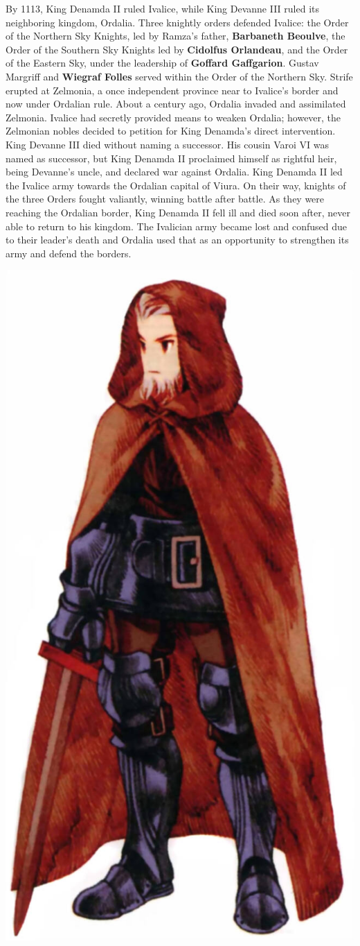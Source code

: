 By 1113, King Denamda II ruled Ivalice, while King Devanne III ruled its neighboring kingdom, Ordalia. 
Three knightly orders defended Ivalice: the Order of the Northern Sky Knights, led by Ramza's father, \textbf{Barbaneth Beoulve}, the Order of the Southern Sky Knights led by \textbf{Cidolfus Orlandeau}, and the Order of the Eastern Sky, under the leadership of \textbf{Goffard Gaffgarion}. 
Gustav Margriff and \textbf{Wiegraf Folles} served within the Order of the Northern Sky.
Strife erupted at Zelmonia, a once independent province near to Ivalice's border and now under Ordalian rule. 
About a century ago, Ordalia invaded and assimilated Zelmonia. 
Ivalice had secretly provided means to weaken Ordalia; however, the Zelmonian nobles decided to petition for King Denamda's direct intervention. 
King Devanne III died without naming a successor. 
His cousin Varoi VI was named as successor, but King Denamda II proclaimed himself as rightful heir, being Devanne's uncle, and declared war against Ordalia.
King Denamda II led the Ivalice army towards the Ordalian capital of Viura. 
On their way, knights of the three Orders fought valiantly, winning battle after battle.
As they were reaching the Ordalian border, King Denamda II fell ill and died soon after, never able to return to his kingdom. The Ivalician army became lost and confused due to their leader's death and Ordalia used that as an opportunity to strengthen its army and defend the borders. 
%
\begin{center}
	\includegraphics[width=0.56\columnwidth]{./art/images/cid.jpg}
\end{center}
